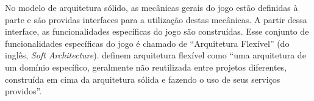 No modelo de arquitetura sólido, as mecânicas gerais do jogo estão definidas à parte e são providas interfaces para a utilização destas mecânicas. A partir dessa interface, as funcionalidades específicas do jogo são construídas. Esse conjunto de funcionalidades específicas do jogo é chamado de “Arquitetura Flexível” (do inglês, \textit{Soft Architecture}).  definem arquitetura flexível como “uma arquitetura de um domínio específico, geralmente não reutilizada entre projetos diferentes, construída em cima da arquitetura sólida e fazendo o uso de seus serviços providos”.
